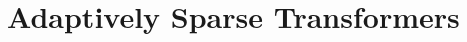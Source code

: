 \documentclass[xetex,aspectratio=169,xcolor,professionalfonts,hyperref]{beamer}
\newcommand{\textover}[3][l]{%
 \makebox[\widthof{#3}][#1]{#2}%
 }
\begin{document}

\section{Adaptively Sparse Transformers}
\end{document}
